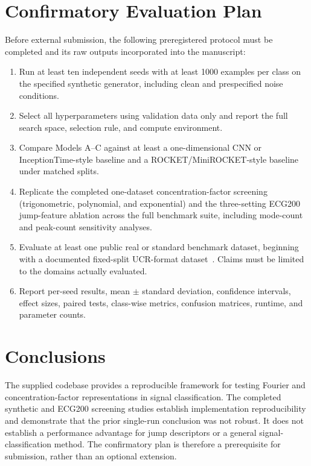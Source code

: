 \documentclass[mathematics,article,submit,moreauthors,pdftex]{mdpi}
\begin{document}
\section{Confirmatory Evaluation Plan}

Before external submission, the following preregistered protocol must be completed and its raw outputs incorporated into the manuscript:
\begin{enumerate}
    \item Run at least ten independent seeds with at least 1000 examples per class on the specified synthetic generator, including clean and prespecified noise conditions.
    \item Select all hyperparameters using validation data only and report the full search space, selection rule, and compute environment.
    \item Compare Models A--C against at least a one-dimensional CNN or InceptionTime-style baseline and a ROCKET/MiniROCKET-style baseline under matched splits.
    \item Replicate the completed one-dataset concentration-factor screening (trigonometric, polynomial, and exponential) and the three-setting ECG200 jump-feature ablation across the full benchmark suite, including mode-count and peak-count sensitivity analyses.
    \item Evaluate at least one public real or standard benchmark dataset, beginning with a documented fixed-split UCR-format dataset~\cite{dau2019ucr}. Claims must be limited to the domains actually evaluated.
    \item Report per-seed results, mean $\pm$ standard deviation, confidence intervals, effect sizes, paired tests, class-wise metrics, confusion matrices, runtime, and parameter counts.
\end{enumerate}

\section{Conclusions}

The supplied codebase provides a reproducible framework for testing Fourier and concentration-factor representations in signal classification. The completed synthetic and ECG200 screening studies establish implementation reproducibility and demonstrate that the prior single-run conclusion was not robust. It does not establish a performance advantage for jump descriptors or a general signal-classification method. The confirmatory plan is therefore a prerequisite for submission, rather than an optional extension.
\end{document}
